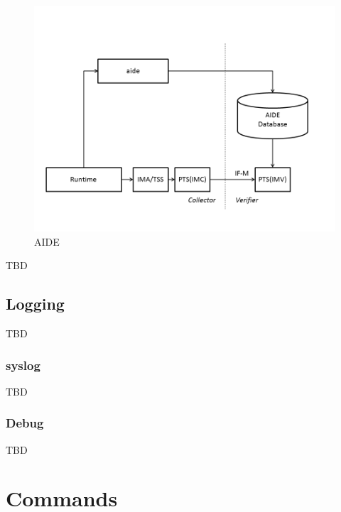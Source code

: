 \documentclass[12pt,a4paper]{article}
\begin{document}
\begin{figure}[b!p]
  \begin{center}
    \includegraphics[width=12cm]{OpenPTS_fig_aide.png}
  \end{center}
  \caption{AIDE}
  \label{fig:aide} 
\end{figure}


TBD


\clearpage 
\subsection{Logging}

TBD

\subsubsection{syslog}

TBD 

\subsubsection{Debug}

TBD

\section{Commands}
\end{document}
